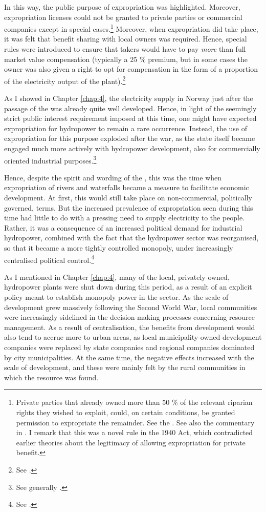 In this way, the public purpose of expropriation was highlighted. Moreover, expropriation licenses could not be granted to private parties or commercial companies except in special cases.\footnote{Private parties that already owned more than 50 \% of the relevant riparian rights they wished to exploit, could, on certain conditions, be granted permission to expropriate the remainder. See the \cite[55]{wra40}. See also the commentary in \cite[70-74]{sorensen41}. I remark that this was a novel rule in the 1940 Act, which contradicted earlier theories about the legitimacy of allowing expropriation for private benefit.} Moreover, when expropriation did take place, it was felt that benefit sharing with local owners was required. Hence, special rules were introduced to ensure that takers would have to pay {\it more} than full market value compensation (typically a 25 \% premium, but in some cases the owner was also given a right to opt for compensation in the form of a proportion of the electricity output of the plant).\footnote{See \cite[70-91,184,210]{sorensen41}.}

As I showed in Chapter \ref{chap:4}, the electricity supply in Norway just after the passage of the \cite{wra40} was already quite well developed. Hence, in light of the seemingly strict public interest requirement imposed at this time, one might have expected expropriation for hydropower to remain a rare occurrence. Instead, the use of expropriation for this purpose exploded after the war, as the state itself became engaged much more actively with hydropower development, also for commercially oriented industrial purposes.\footnote{See generally \cite{skjold06}.}

Hence, despite the spirit and wording of the \cite{wra40}, this was the time when expropriation of rivers and waterfalls became a measure to facilitate economic development. At first, this would still take place on non-commercial, politically governed, terms. But the increased prevalence of expropriation seen during this time had little to do with a pressing need to supply electricity to the people. Rather, it was a consequence of an increased political demand for industrial hydropower, combined with the fact that the hydropower sector was reorganised, so that it became a more tightly controlled monopoly, under increasingly centralised political control.\footnote{See \cite{skjold06,thue06b}.}

As I mentioned in Chapter \ref{chap:4}, many of the local, privately owned, hydropower plants were shut down during this period, as a result of an explicit policy meant to establish monopoly power in the sector. As the scale of development grew massively following the Second World War, local communities were increasingly sidelined in the decision-making processes concerning resource management. As a result of centralisation, the benefits from development would also tend to accrue more to urban areas, as local municipality-owned development companies were replaced by state companies and regional companies dominated by city municipalities. At the same time, the negative effects increased with the scale of development, and these were mainly felt by the rural communities in which the resource was found.

